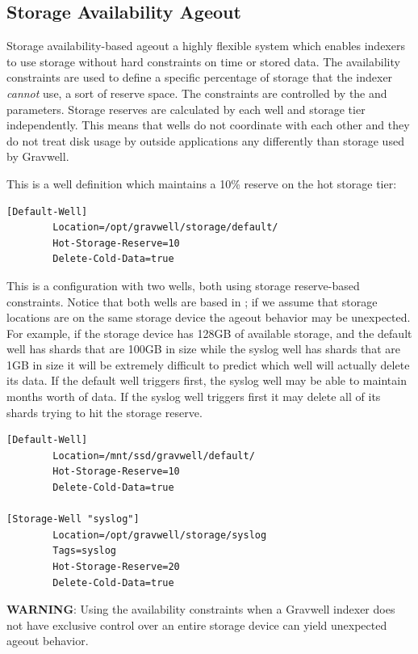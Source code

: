 {{\subsection{Storage Availability Ageout}

Storage availability-based ageout a highly flexible system which
enables indexers to use storage without hard constraints on time or
stored data. The availability constraints are used to define a specific
percentage of storage that the indexer \emph{cannot} use, a sort of reserve
space. The constraints are controlled by the
 and  parameters.
Storage reserves are calculated by each well and storage tier
independently. This means that wells do not coordinate with each other
and they do not treat disk usage by outside applications any differently
than storage used by Gravwell.

This is a well definition which maintains a 10\% reserve on the hot
storage tier:

\begin{Verbatim}[breaklines=true]
[Default-Well]
        Location=/opt/gravwell/storage/default/
        Hot-Storage-Reserve=10
        Delete-Cold-Data=true
\end{Verbatim}

This is a configuration with two wells, both using storage
reserve-based constraints. Notice that both wells are based in
; if we assume that storage locations are on
the same storage device the ageout behavior may be unexpected. For
example, if the storage device has 128GB of available storage, and the
default well has shards that are 100GB in size while the syslog well has
shards that are 1GB in size it will be extremely difficult to predict
which well will actually delete its data. If the default well
triggers first, the syslog well may be able to maintain months worth
of data. If the syslog well triggers first it may delete all of its
shards trying to hit the storage reserve.

\begin{Verbatim}[breaklines=true]
[Default-Well]
        Location=/mnt/ssd/gravwell/default/
        Hot-Storage-Reserve=10
        Delete-Cold-Data=true

[Storage-Well "syslog"]
        Location=/opt/gravwell/storage/syslog
        Tags=syslog
        Hot-Storage-Reserve=20
        Delete-Cold-Data=true
\end{Verbatim}

\textbf{WARNING}: Using the availability constraints when a Gravwell indexer
does not have exclusive control over an entire storage device can yield
unexpected ageout behavior.

}}
